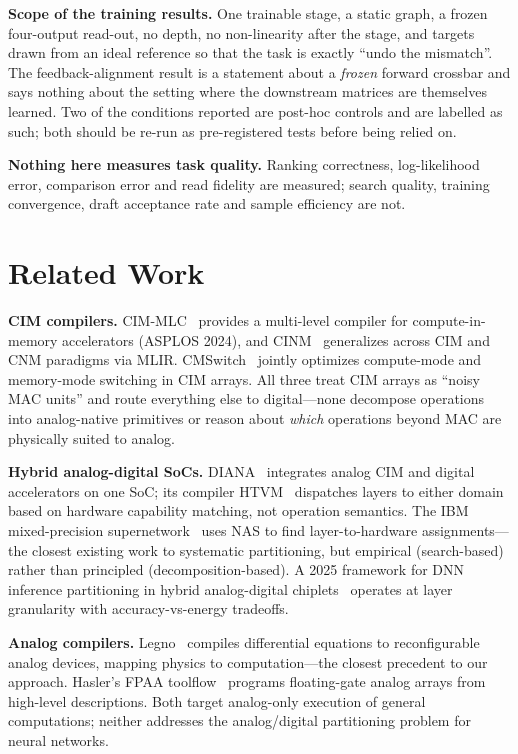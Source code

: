 \documentclass[11pt]{article}
\begin{document}
\textbf{Scope of the training results.} One trainable stage, a static graph, a frozen four-output read-out, no depth, no non-linearity after the stage, and targets drawn from an ideal reference so that the task is exactly ``undo the mismatch''. The feedback-alignment result is a statement about a \textit{frozen} forward crossbar and says nothing about the setting where the downstream matrices are themselves learned. Two of the conditions reported are post-hoc controls and are labelled as such; both should be re-run as pre-registered tests before being relied on.

\textbf{Nothing here measures task quality.} Ranking correctness, log-likelihood error, comparison error and read fidelity are measured; search quality, training convergence, draft acceptance rate and sample efficiency are not.

\section{Related Work}
\label{sec:related}

\textbf{CIM compilers.} CIM-MLC~\cite{cimmlc2024} provides a multi-level compiler for compute-in-memory accelerators (ASPLOS 2024), and CINM~\cite{cinm2024} generalizes across CIM and CNM paradigms via MLIR. CMSwitch~\cite{cmswitch2025} jointly optimizes compute-mode and memory-mode switching in CIM arrays. All three treat CIM arrays as ``noisy MAC units'' and route everything else to digital---none decompose operations into analog-native primitives or reason about \textit{which} operations beyond MAC are physically suited to analog.

\textbf{Hybrid analog-digital SoCs.} DIANA~\cite{diana2022} integrates analog CIM and digital accelerators on one SoC; its compiler HTVM~\cite{htvm2023} dispatches layers to either domain based on hardware capability matching, not operation semantics. The IBM mixed-precision supernetwork~\cite{ibm_supernetwork2026} uses NAS to find layer-to-hardware assignments---the closest existing work to systematic partitioning, but empirical (search-based) rather than principled (decomposition-based). A 2025 framework for DNN inference partitioning in hybrid analog-digital chiplets~\cite{hybrid_partition2024} operates at layer granularity with accuracy-vs-energy tradeoffs.

\textbf{Analog compilers.} Legno~\cite{legno2020} compiles differential equations to reconfigurable analog devices, mapping physics to computation---the closest precedent to our approach. Hasler's FPAA toolflow~\cite{hasler2020} programs floating-gate analog arrays from high-level descriptions. Both target analog-only execution of general computations; neither addresses the analog/digital partitioning problem for neural networks.
\end{document}
